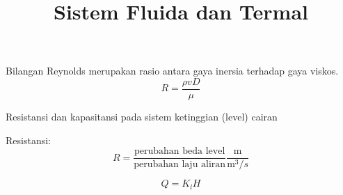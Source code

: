 \documentclass[a4paper]{article}
\begin{document}
\title{Sistem Fluida dan Termal}
\author{}
\maketitle


Bilangan Reynolds merupakan rasio antara gaya inersia terhadap gaya viskos.
\begin{equation}
R = \frac{\rho v D}{\mu}
\end{equation}


Resistansi dan kapasitansi pada sistem ketinggian (level) cairan

Resistansi:
\begin{equation}
R = \frac{ \text{perubahan beda level} }{ \text{perubahan laju aliran} }
\frac{\mathrm{m}}{\mathrm{m}^3/s}
\end{equation}

$$
Q = K_{l} H
$$
\end{document}
